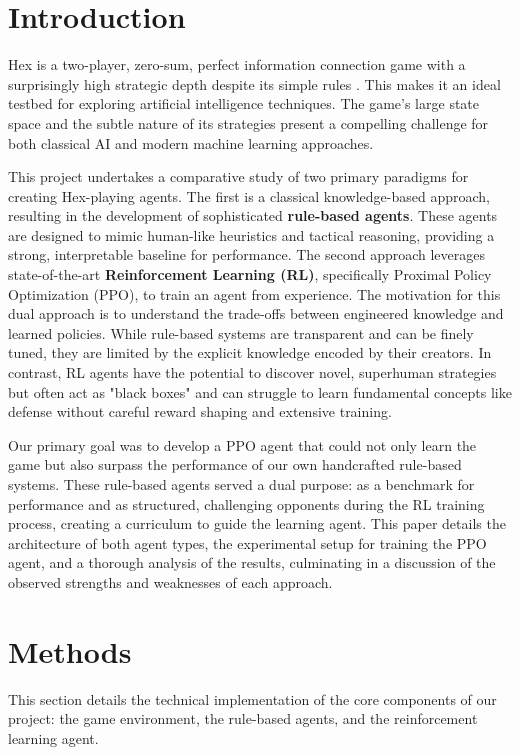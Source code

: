 \documentclass[conference]{IEEEtran}
\begin{document}
\section{Introduction}
Hex is a two-player, zero-sum, perfect information connection game with a surprisingly high strategic depth despite its simple rules \cite{b1}. This makes it an ideal testbed for exploring artificial intelligence techniques. The game's large state space and the subtle nature of its strategies present a compelling challenge for both classical AI and modern machine learning approaches.

This project undertakes a comparative study of two primary paradigms for creating Hex-playing agents. The first is a classical knowledge-based approach, resulting in the development of sophisticated \textbf{rule-based agents}. These agents are designed to mimic human-like heuristics and tactical reasoning, providing a strong, interpretable baseline for performance. The second approach leverages state-of-the-art \textbf{Reinforcement Learning (RL)}, specifically Proximal Policy Optimization (PPO), to train an agent from experience. The motivation for this dual approach is to understand the trade-offs between engineered knowledge and learned policies. While rule-based systems are transparent and can be finely tuned, they are limited by the explicit knowledge encoded by their creators. In contrast, RL agents have the potential to discover novel, superhuman strategies but often act as "black boxes" and can struggle to learn fundamental concepts like defense without careful reward shaping and extensive training.

Our primary goal was to develop a PPO agent that could not only learn the game but also surpass the performance of our own handcrafted rule-based systems. These rule-based agents served a dual purpose: as a benchmark for performance and as structured, challenging opponents during the RL training process, creating a curriculum to guide the learning agent. This paper details the architecture of both agent types, the experimental setup for training the PPO agent, and a thorough analysis of the results, culminating in a discussion of the observed strengths and weaknesses of each approach.

\section{Methods}
This section details the technical implementation of the core components of our project: the game environment, the rule-based agents, and the reinforcement learning agent.
\end{document}
